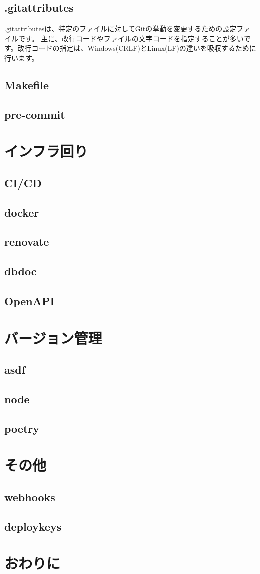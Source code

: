 \subsection{.gitattributes}
.gitattributesは、特定のファイルに対してGitの挙動を変更するための設定ファイルです。
主に、改行コードやファイルの文字コードを指定することが多いです。改行コードの指定は、Windows(CRLF)とLinux(LF)の違いを吸収するために行います。


\subsection{Makefile}
\subsection{pre-commit}


\section{インフラ回り}

\subsection{CI/CD}
\subsection{docker}
\subsection{renovate}
\subsection{dbdoc}
\subsection{OpenAPI}

\section{バージョン管理}

\subsection{asdf}
\subsection{node}
\subsection{poetry}

\section{その他}
\subsection{webhooks}
\subsection{deploykeys}

\section{おわりに}